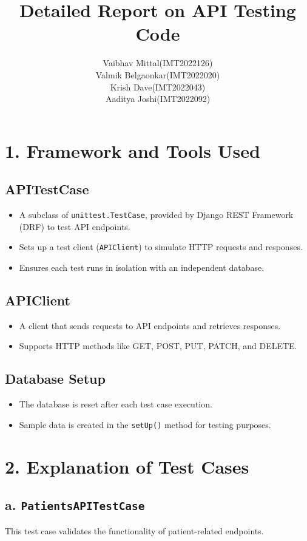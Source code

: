\documentclass[12pt]{article}
\title{Detailed Report on API Testing Code}
\author{
Vaibhav Mittal(IMT2022126) \\
Valmik Belgaonkar(IMT2022020)\\
Krish Dave(IMT2022043) \\
Aaditya Joshi(IMT2022092) \\
}
\date{}
\begin{document}
\maketitle

\section*{1. Framework and Tools Used}

\subsection*{APITestCase}
\begin{itemize}
    \item A subclass of \texttt{unittest.TestCase}, provided by Django REST Framework (DRF) to test API endpoints.
    \item Sets up a test client (\texttt{APIClient}) to simulate HTTP requests and responses.
    \item Ensures each test runs in isolation with an independent database.
\end{itemize}

\subsection*{APIClient}
\begin{itemize}
    \item A client that sends requests to API endpoints and retrieves responses.
    \item Supports HTTP methods like GET, POST, PUT, PATCH, and DELETE.
\end{itemize}

\subsection*{Database Setup}
\begin{itemize}
    \item The database is reset after each test case execution.
    \item Sample data is created in the \texttt{setUp()} method for testing purposes.
\end{itemize}

\section*{2. Explanation of Test Cases}

\subsection*{a. \texttt{PatientsAPITestCase}}
This test case validates the functionality of patient-related endpoints.
\end{document}
